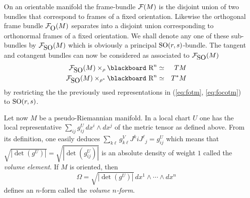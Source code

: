 \documentclass[12pt,titlepage]{article}
\def\bbf#1{\hbox{\blackboard #1}}
\def\lR{\bbf R}
\def\cF{{\cal F}}
\def\O{\hbox{O}}
\def\SO{\hbox{SO}}
\begin{document}
On an orientable manifold the frame-bundle \(\cF(M)\) is the disjoint
union of two bundles that correspond to frames of a fixed orientation.
Likewise the orthogonal frame bundle \(\cF_{\O}(M)\) separates into a
disjoint union corresponding to orthonormal frames of a fixed
orientation.  We shall denote any one  of these sub-bundles 
by \(\cF_{\SO}(M)\)
\index{\(F_{SO}(M)\)@\(\cF_{\SO}(M)\)}%
which is obviously a principal \(\SO(r,s)\)-bundle. The tangent and
cotangent bundles can now be considered as associated to \(\cF_{\SO}(M)\)
\begin{eqnarray*}%
\cF_{\SO}(M)\times_\rho {\lR}^n  &\simeq &  TM \\
\cF_{\SO}(M)\times_{\rho^*} {\lR}^n &\simeq &  T^*M
\end{eqnarray*}%
by restricting the  the previously used 
representations in (\ref{eq:fotm}, \ref{eq:focotm}) to \(\SO(r,s)\).



Let now  \(M\) be a pseudo-Riemannian manifold. In a
local
chart \(U\) one has the local 
representative \(\sum_{ij}g_{ij}^U\,dx^i\wedge dx^j\) of 
the metric tensor as 
defined above. From
its
definition, one easily deduces
\(\sum_{k\ell}g^V_{k\ell} J^k{}iJ^\ell{}_j = g^U_{ij}\) which means that
\(\sqrt{|\det(g^U)|} = \sqrt{|\det (g^U_{ij})|}\) is an absolute density of
weight \(1\) called the {\em volume element\/}.
%
  If \(M\) is oriented, then 
\[%
\Omega = \sqrt{|\det (g^U)|}\,  dx^1\wedge\cdots\wedge dx^n
\]%
defines an \(n\)-form called the {\em volume \(n\)-form\/}.
%
\end{document}
